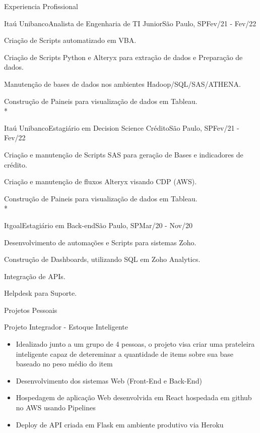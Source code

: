 \documentclass{article}
\newlength{\tabin}
\newlength{\secsep}
\newcommand{\lineunder}{\vspace*{-8pt} \\ \hspace*{-6pt} \hrulefill \\ \vspace*{-15pt}}
\newenvironment{tabbedsection}[1]{
  \begin{list}{}{
      \setlength{\itemsep}{0pt}
      \setlength{\labelsep}{0pt}
      \setlength{\labelwidth}{0pt}
      \setlength{\leftmargin}{\tabin}
      \setlength{\rightmargin}{\tabin}
      \setlength{\listparindent}{0pt}
      \setlength{\parsep}{0pt}
      \setlength{\parskip}{0pt}
      \setlength{\partopsep}{0pt}
      \setlength{\topsep}{#1}
    }
  \item[]
}{\end{list}}
\newenvironment{resume_section}[1]{
  \filbreak
  \vspace{2\secsep}
  \textsc{\large#1}
  \lineunder
  \begin{tabbedsection}{\secsep}
}{\end{tabbedsection}}
\newenvironment{resume_subsection}[2][]{
  \textbf{#2} \hfill {\footnotesize #1} \hspace{2em}
  \begin{tabbedsection}{0.5\secsep}
}{\end{tabbedsection}}
\newenvironment{subitems}{
  \renewcommand{\labelitemi}{-}
  \begin{itemize}
      \setlength{\labelsep}{1em}
}{\end{itemize}}
\newenvironment{resume_employer}[4]{
  \vspace{\secsep}
  \textbf{#1} \\ 
  \indent {\small #2} \hfill {\footnotesize#3 (#4)}
  \begin{tabbedsection}{0pt}
  \begin{subitems}
}{\end{subitems}\end{tabbedsection}}
\begin{document}
\begin{resume_section}{Experiencia Profissional}
  \begin{resume_employer}{Itaú Unibanco}{Analista de Engenharia de TI Junior}{São Paulo, SP}{Fev/21 - Fev/22}
    \item Criação de Scripts automatizado em VBA. 
    \item Criação de Scripts Python e Alteryx para extração de dados e Preparação de dados.
    \item Manutenção de bases de dados nos ambientes Hadoop/SQL/SAS/ATHENA.
    \item Construção de Paineis para visualização de dados em Tableau. \\*
  \end{resume_employer}
  
  \begin{resume_employer}{Itaú Unibanco}{Estagiário em Decision Science Crédito}{São Paulo, SP}{Fev/21 - Fev/22}
    \item Criação e manutenção de Scripts SAS para geração de Bases e indicadores de crédito.
    \item Criação e manutenção de fluxos Alteryx visando CDP (AWS).
    \item Construção de Paineis para visualização de dados em Tableau.\\*
  \end{resume_employer}
  
  \begin{resume_employer}{Itgoal}{Estagiário em Back-end}{São Paulo, SP}{Mar/20 - Nov/20}
    \item	Desenvolvimento de automações e Scripts para sistemas Zoho.
    \item	Construção de Dashboards, utilizando SQL em Zoho Analytics.
    \item	Integração de APIs.
    \item	Helpdesk para Suporte.
  \end{resume_employer}
\end{resume_section}


\begin{resume_section}{Projetos Pessoais}
  \begin{resume_subsection}[(Julho-2022)]{Projeto Integrador - Estoque Inteligente}
    \begin{subitems}
      \item Idealizado junto a um grupo de 4 pessoas, o projeto visa criar uma prateleira inteligente capaz de detereminar a quantidade de items sobre sua base baseado no peso médio do item
      \item Desenvolvimento dos sistemas Web (Front-End e Back-End)
      \item Hospedagem de aplicação Web desenvolvida em React hospedada em github no AWS usando Pipelines
      \item Deploy de API criada em Flask em ambiente produtivo via Heroku
    \end{subitems}
  \end{resume_subsection}
\end{resume_section}
\end{document}
